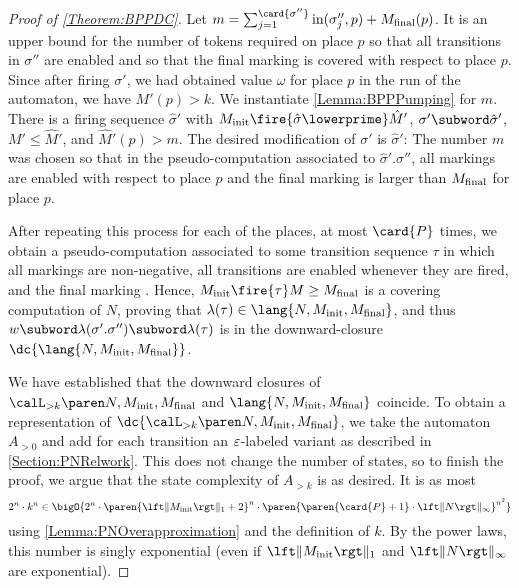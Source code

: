 \documentclass[../../diss.tex]{subfiles}
\begin{document}
\begin{proof}[Proof of \cref{Theorem:BPPDC}]
    Let $m = \sum_{j = 1}^{\card{\sigma''}} \i(\sigma''_j,p) + \Mfinal(p)$.
    It is an upper bound for the number of tokens required on place $p$ so that all transitions in $\sigma''$ are enabled and so that the final marking is covered with respect to place $p$.
    Since after firing $\sigma'$, we had obtained value $\omega$ for place $p$ in the run of the automaton, we have $M' (p) > k$.
    We instantiate \cref{Lemma:BPPPumping} for $m$.
    There is a firing sequence $\hat{\sigma}'$ with $\Minit \fire{\hat{\sigma}\lowerprime} \hat{M}'$, $\sigma' \subword \hat{\sigma}'$, $M' \leq \hat{M}'$, and $\hat{M}'(p) > m$.
    The desired modification of $\sigma'$ is $\hat{\sigma}'$:
    The number $m$ was chosen so that in the pseudo-computation associated to $\hat{\sigma}'.\sigma''$, all markings are enabled with respect to place $p$ and the final marking is larger than $M_{\text{final}}$ for place $p$.

    After repeating this process for each of the places, \ie at most $\card{P}$ times, we obtain a pseudo-computation associated to some transition sequence $\tau$ in which all markings are non-negative, all transitions are enabled whenever they are fired, and the final marking .
    Hence, $\Minit \fire{\tau} M \geq \Mfinal$ is a covering computation of $N$, proving that $\lambda(\tau) \in \lang{N,\Minit,\Mfinal}$, and thus $w \subword \lambda(\sigma'.\sigma'') \subword \lambda(\tau)$ is in the downward-closure $\dc{\lang{N,\Minit,\Mfinal}}$.

    We have established that the downward closures of $\langoak{k}{N,\Minit,\Mfinal}$ and $\lang{N,\Minit,\Mfinal}$ coincide.
    To obtain a representation of $\dc{\langoak{k}{N,\Minit,\Mfinal}}$, we take the automaton $A_{> 0}$ and add for each transition an $\varepsilon$-labeled variant as described in \cref{Section:PNRelwork}.
    This does not change the number of states, so to finish the proof, we argue that the state complexity of $A_{> k}$ is as desired.
    It is as most
    \[
         2^n \cdot k^n
         \in \bigO{
             2^n
             \cdot
             \paren{\normone{\Minit}+2}^n
             \cdot
             \paren{ \paren{\card{P}+1} \cdot \norminf{N}}^{ n^2 }
         }
    \]
    using \cref{Lemma:PNOverapproximation} and the definition of $k$.
    By the power laws, this number is singly exponential (even if $\normone{\Minit}$ and $\norminf{N}$ are exponential).
\end{proof}
\end{document}
